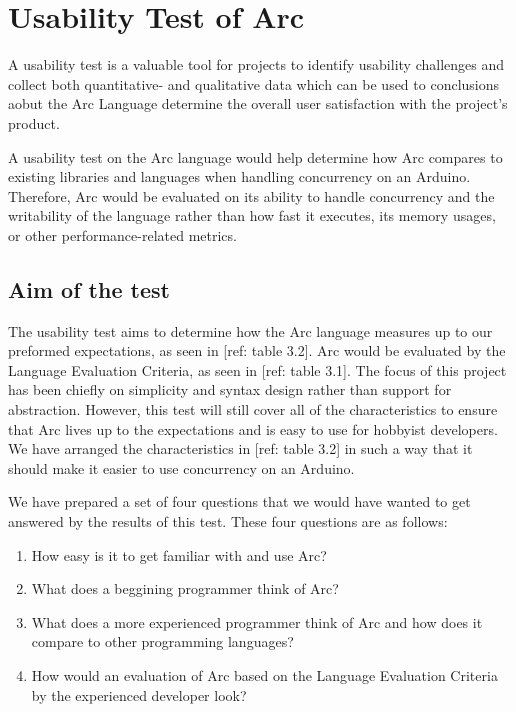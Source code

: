\section{Usability Test of Arc}\label{subsec:usabilityTestOfArc}

A usability test is a valuable tool for projects to identify usability challenges and collect both quantitative- and qualitative data which can be used to conclusions aobut the Arc Language
determine the overall user satisfaction with the project's product.

A usability test on the Arc language would help determine how Arc compares to existing libraries and languages when handling concurrency on an Arduino. Therefore, Arc would be evaluated on its ability to handle concurrency and the writability of the language rather than how fast it executes, its memory usages, or other performance-related metrics.

\subsection{Aim of the test}\label{subsubsec:aimOfTheTest}

The usability test aims to determine how the Arc language measures up to our preformed expectations, as seen in [ref: table 3.2]. Arc would be evaluated by the Language Evaluation Criteria, as seen in [ref: table 3.1]. The focus of this project has been chiefly on simplicity and syntax design rather than support for abstraction. However, this test will still cover all of the characteristics to ensure that Arc lives up to the expectations and is easy to use for hobbyist developers. We have arranged the characteristics in [ref: table 3.2] in such a way that it should make it easier to use concurrency on an Arduino.

We have prepared a set of four questions that we would have wanted to get answered by the results of this test. These four questions are as follows:

\begin{enumerate}
    \item How easy is it to get familiar with and use Arc?
    \item What does a beggining programmer think of Arc?
    \item What does a more experienced programmer think of Arc and how does it compare to other programming languages?
    \item How would an evaluation of Arc based on the Language Evaluation Criteria by the experienced developer look?
\end{enumerate}

